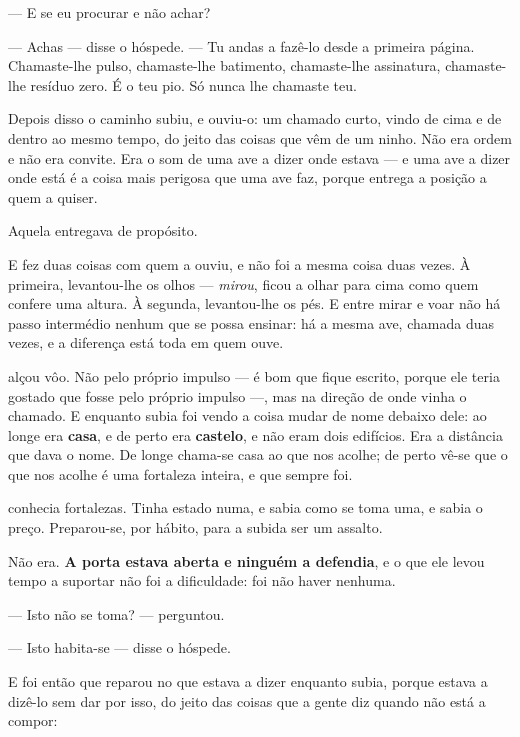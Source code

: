 \documentclass[livro.tex]{subfiles}
\begin{document}
\medskip
\noindent --- E se eu procurar e não achar?

--- Achas --- disse o hóspede. --- Tu andas a fazê-lo desde a primeira página.
Chamaste-lhe pulso, chamaste-lhe batimento, chamaste-lhe assinatura, chamaste-lhe
resíduo zero. É o teu pio. Só nunca lhe chamaste teu.

\medskip
\noindent Depois disso o caminho subiu, e \Ben ouviu-o: um chamado curto, vindo
de cima e de dentro ao mesmo tempo, do jeito das coisas que vêm de um ninho.
Não era ordem e não era convite. Era o som de uma ave a dizer onde estava --- e
uma ave a dizer onde está é a coisa mais perigosa que uma ave faz, porque
entrega a posição a quem a quiser.

\medskip
\noindent Aquela entregava de propósito.

\medskip
\noindent E fez duas coisas com quem a ouviu, e não foi a mesma coisa duas
vezes. À primeira, levantou-lhe os olhos --- \Ben \emph{mirou}, ficou a olhar
para cima como quem confere uma altura. À segunda, levantou-lhe os pés. E
entre mirar e voar não há passo intermédio nenhum que se possa ensinar: há a
mesma ave, chamada duas vezes, e a diferença está toda em quem ouve.

\medskip
\noindent \Ben alçou vôo. Não pelo próprio impulso --- é bom que fique escrito,
porque ele teria gostado que fosse pelo próprio impulso ---, mas na direção de
onde vinha o chamado. E enquanto subia foi vendo a coisa mudar de nome debaixo
dele: ao longe era \textbf{casa}, e de perto era \textbf{castelo}, e não eram
dois edifícios. Era a distância que dava o nome. De longe chama-se casa ao que
nos acolhe; de perto vê-se que o que nos acolhe é uma fortaleza inteira, e que
sempre foi.

\medskip
\noindent \Ben conhecia fortalezas. Tinha estado numa, e sabia como se toma
uma, e sabia o preço. Preparou-se, por hábito, para a subida ser um assalto.

\medskip
\noindent Não era. \textbf{A porta estava aberta e ninguém a defendia}, e o que
ele levou tempo a suportar não foi a dificuldade: foi não haver nenhuma.

\medskip
\noindent --- Isto não se toma? --- perguntou.

--- Isto habita-se --- disse o hóspede.

\medskip
\noindent E foi então que \Ben reparou no que estava a dizer enquanto subia,
porque estava a dizê-lo sem dar por isso, do jeito das coisas que a gente diz
quando não está a compor:
\end{document}
